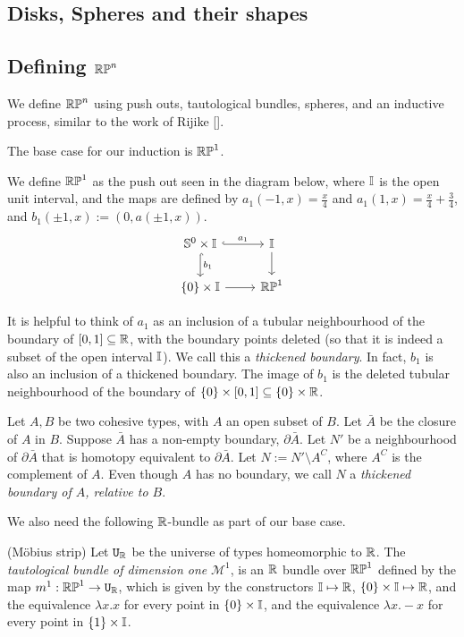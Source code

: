 \documentclass{amsart}
\begin{document}
\subsection{Disks, Spheres and their shapes}
\subsection{Defining $\mathbb{RP}^n$}
We define $\mathbb{RP}^n$ using push outs, tautological bundles, spheres, and an inductive process, similar to the work of Rijike [].

The base case for our induction is $\mathbb{RP}^1$.

\begin{definition}
We define $\mathbb{RP}^1$ as the push out seen in the diagram below, where $\mathbb{I}$ is the open unit interval, and the maps are defined by $a_1(-1,x) = \frac{x}{4}$ and $a_1(1,x)= \frac{x}{4} + \frac{3}{4}$, and $b_1 (\pm 1, x) := (0, a(\pm1, x))$.\\
\[\begin{tikzcd}
\set{S}^0 \times \set{I} \arrow[r, hook, "a_1"] \arrow[d, hook, "b_1" ] & \set{I} \arrow[d]\\
\{0 \} \times \set{I} \arrow[r] & \set{RP}^1
\end{tikzcd}
\]
\end{definition}

It is helpful to think of $a_1$ as an inclusion of a tubular neighbourhood of the boundary of $[0,1] \subseteq \mathbb{R}$, with the boundary points deleted (so that it is indeed a subset of the open interval $\mathbb{I}$). We call this a \emph{thickened boundary}. In fact, $b_1$ is also an inclusion of a thickened boundary. The image of $b_1$ is the deleted tubular neighbourhood of the boundary of $\{0\} \times [0,1] \subseteq \{0\} \times \mathbb{R}$.

\begin{definition}
Let $A, B$ be two cohesive types, with $A$ an open subset of $B$. Let $\bar{A}$ be the closure of $A$ in $B$. Suppose $\bar{A}$ has a non-empty boundary, $\partial \bar{A}$. Let $N'$ be a neighbourhood of $\partial\bar{A}$ that is homotopy equivalent to $\partial\bar{A}$. Let $N := N' \setminus A^C$, where $A^C$ is the complement of $A$. Even though $A$ has no boundary, we call $N$ a \emph{thickened boundary of $A$, relative to $B$}.
 \end{definition}

We also need the following $\mathbb{R}$-bundle as part of our base case. 
\begin{definition}(M\"{o}bius strip)
Let $\mathtt{U}_{\mathbb{R}}$ be the universe of types homeomorphic to $\mathbb{R}$. The \emph{tautological bundle of dimension one} $\mathcal{M}^1$, is an $\mathbb{R}$ bundle over $\mathbb{RP}^1$ defined by the map $m^1: \mathbb{RP}^1 \rightarrow \mathtt{U}_{\mathbb{R}}$, which is given by the constructors $\mathbb{I} \mapsto \mathbb{R}$, $\{0 \} \times \mathbb{I} \mapsto \mathbb{R}$, and the equivalence $\lambda x. x$ for every point in $\{0\} \times \mathbb{I}$, and the equivalence $\lambda x. -x$ for every point in $\{1\} \times \mathbb{I}$.
 \end{definition}
\end{document}
